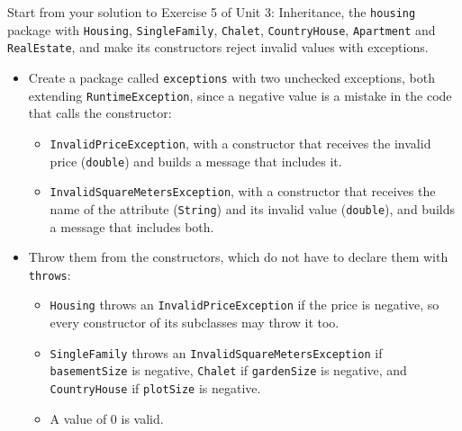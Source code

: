 Start from your solution to Exercise 5 of Unit 3: Inheritance, the \texttt{housing} package with \texttt{Housing}, \texttt{SingleFamily}, \texttt{Chalet}, \texttt{CountryHouse}, \texttt{Apartment} and \texttt{RealEstate}, and make its constructors reject invalid values with exceptions.

\begin{itemize}

    \item Create a package called \texttt{exceptions} with two unchecked exceptions, both extending \texttt{RuntimeException}, since a negative value is a mistake in the code that calls the constructor:

        \begin{itemize}

            \item \texttt{InvalidPriceException}, with a constructor that receives the invalid price (\texttt{double}) and builds a message that includes it.

            \item \texttt{InvalidSquareMetersException}, with a constructor that receives the name of the attribute (\texttt{String}) and its invalid value (\texttt{double}), and builds a message that includes both.

        \end{itemize}

    \item Throw them from the constructors, which do not have to declare them with \texttt{throws}:

        \begin{itemize}

            \item \texttt{Housing} throws an \texttt{InvalidPriceException} if the price is negative, so every constructor of its subclasses may throw it too.

            \item \texttt{SingleFamily} throws an \texttt{InvalidSquareMetersException} if \texttt{basementSize} is negative, \texttt{Chalet} if \texttt{gardenSize} is negative, and \texttt{CountryHouse} if \texttt{plotSize} is negative.

            \item A value of 0 is valid.

        \end{itemize}

\end{itemize}

